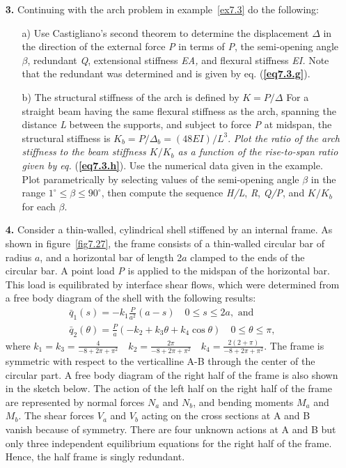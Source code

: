 \documentclass{AeroStructure-ERJohnson}
\begin{document}
\begin{exercise}
\begin{enumerate}[\textbf{2.}]
\item[\textbf{3.}] Continuing with the arch problem in example~\ref{ex7.3} do the following:
\begin{enumerate}[b)]
\item[{\hskip13pt}a)] Use Castigliano's second theorem to determine the displacement $\Delta$ in the direction of the external force \textit{P} in terms of \textit{P}, the semi-opening angle $\beta$, redundant \textit{Q}, extensional stiffness\textit{ EA, }and flexural stiffness\textit{ EI. }Note that the redundant was determined and is given by eq. (\textbf{\ref{eq7.3.g}}).

\item[{\hskip13pt}b)] The structural stiffness of the arch is defined by $K = P/\Delta$ For a straight beam having the same flexural stiffness as the arch, spanning the distance \textit{L} between the supports, and subject to force \textit{P} at midspan, the structural stiffness is $K_{b}=P/\Delta_{b}=(48 EI)/L^{3}$. \textit{Plot the ratio of the arch stiffness to the beam stiffness $K/K_{b}$ as a function of the rise-to-span ratio given by eq.} (\textbf{\ref{eq7.3.h}}). Use the numerical data given in the example. Plot parametrically by selecting values of the semi-opening angle $\beta$ in the range $1^{\circ} \leq \beta \leq 90^{\circ}$, then compute the sequence \textit{H/L}, \textit{R}, \textit{Q/P}, and $K / K_{b}$ for each $\beta$.
\end{enumerate}

\item[\textbf{4.}] Consider a thin-walled, cylindrical shell stiffened by an internal frame. As shown in figure~\ref{fig7.27}, the frame consists of a thin-walled circular bar of radius $a$, and a horizontal bar of length 2$a$ clamped to the ends of the circular bar. A point load \textit{P} is applied to the midspan of the horizontal bar. This load is equilibrated by interface shear flows, which were determined from a free body diagram of the shell with the following results:
\begin{gather}
\bar{q}_{1}(s)=-k_{1} \frac{P}{a^{2}}(a-s) \quad 0 \leq s \leq 2 a, \textrm{ and}\label{eq7.47}\\
\bar{q}_{2}(\theta)=\frac{P}{a}\left(-k_{2}+k_{3} \theta+k_{4} \cos \theta\right) \quad 0 \leq \theta \leq \pi, \label{eq7.48}
\end{gather}
where $k_{1}=k_{3}=\frac{4}{-8+2 \pi+\pi^{2}} \quad k_{2}=\frac{2 \pi}{-8+2 \pi+\pi^{2}} \quad k_{4}=\frac{2(2+\pi)}{-8+2 \pi+\pi^{2}}$. The frame is symmetric with respect to the vertical\vspace*{3pt}\break line A-B through the center of the circular part. A free body diagram of the right half of the frame is also shown in the sketch below. The action of the left half on the right half of the frame are represented by normal forces $N_{{a}}$ and $N_{{b}}$, and bending moments $M_{{a}}$ and $M_{{b}}$. The shear forces $V_{{a}}$ and $V_{{b}}$ acting on the cross sections at A and B vanish because of symmetry. There are four unknown actions at A and B but only three independent equilibrium equations for the right half of the frame. Hence, the half frame is singly redundant.


\end{enumerate}
\end{exercise}
\end{document}
